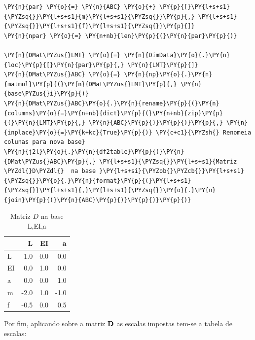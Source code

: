     \begin{tcolorbox}[breakable, size=fbox, boxrule=1pt, pad at break*=1mm,colback=cellbackground, colframe=cellborder]
\begin{Verbatim}[commandchars=\\\{\}]
\PY{n}{par} \PY{o}{=} \PY{n}{ABC} \PY{o}{+} \PY{p}{[}\PY{l+s+s1}{\PYZsq{}}\PY{l+s+s1}{m}\PY{l+s+s1}{\PYZsq{}}\PY{p}{,} \PY{l+s+s1}{\PYZsq{}}\PY{l+s+s1}{f}\PY{l+s+s1}{\PYZsq{}}\PY{p}{]}
\PY{n}{npar} \PY{o}{=} \PY{n+nb}{len}\PY{p}{(}\PY{n}{par}\PY{p}{)}

\PY{n}{DMat\PYZus{}LMT} \PY{o}{=} \PY{n}{DimData}\PY{o}{.}\PY{n}{loc}\PY{p}{[}\PY{n}{par}\PY{p}{,} \PY{n}{LMT}\PY{p}{]}
\PY{n}{DMat\PYZus{}ABC} \PY{o}{=} \PY{n}{np}\PY{o}{.}\PY{n}{matmul}\PY{p}{(}\PY{n}{DMat\PYZus{}LMT}\PY{p}{,} \PY{n}{base\PYZus{}i}\PY{p}{)}
\PY{n}{DMat\PYZus{}ABC}\PY{o}{.}\PY{n}{rename}\PY{p}{(}\PY{n}{columns}\PY{o}{=}\PY{n+nb}{dict}\PY{p}{(}\PY{n+nb}{zip}\PY{p}{(}\PY{n}{LMT}\PY{p}{,} \PY{n}{ABC}\PY{p}{)}\PY{p}{)}\PY{p}{,} \PY{n}{inplace}\PY{o}{=}\PY{k+kc}{True}\PY{p}{)} \PY{c+c1}{\PYZsh{} Renomeia colunas para nova base}
\PY{n}{j2l}\PY{o}{.}\PY{n}{df2table}\PY{p}{(}\PY{n}{DMat\PYZus{}ABC}\PY{p}{,} \PY{l+s+s1}{\PYZsq{}}\PY{l+s+s1}{Matriz \PYZdl{}D\PYZdl{}  na base }\PY{l+s+si}{\PYZob{}\PYZcb{}}\PY{l+s+s1}{\PYZsq{}}\PY{o}{.}\PY{n}{format}\PY{p}{(}\PY{l+s+s1}{\PYZsq{}}\PY{l+s+s1}{,}\PY{l+s+s1}{\PYZsq{}}\PY{o}{.}\PY{n}{join}\PY{p}{(}\PY{n}{ABC}\PY{p}{)}\PY{p}{)}\PY{p}{)}
\end{Verbatim}
\end{tcolorbox}

    
    \begin{table}[H]
    \centering
    \caption{Matriz $D$  na base L,EI,a}
    {\begin{tabular}{lrrr}
\toprule
{} &    L &   EI &    a \\
\midrule
L  &  1.0 &  0.0 &  0.0 \\
EI &  0.0 &  1.0 &  0.0 \\
a  &  0.0 &  0.0 &  1.0 \\
m  & -2.0 &  1.0 & -1.0 \\
f  & -0.5 &  0.0 &  0.5 \\
\bottomrule
\end{tabular}
}
    \label{}
    \end{table}
    

    
    Por fim, aplicando sobre a matriz \(\bf{D}\) as escalas impostas tem-se
a tabela de escalas:

